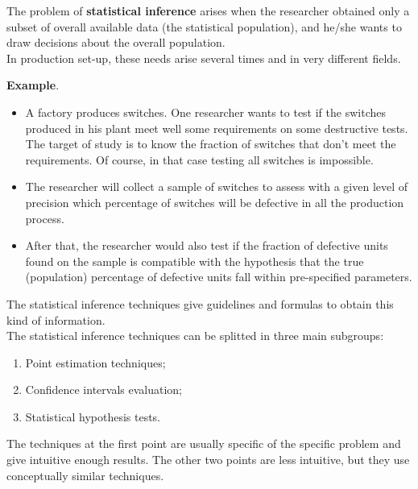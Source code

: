 
\begin{frame}
  \vspace*{.75cm}
  The problem of \textbf{statistical inference} arises when the researcher obtained only a subset of overall available data (the statistical population), and he/she wants to draw decisions about the overall population. \\
  \vspace*{.75cm}
  In production set-up, these needs arise several times and in very different fields.\\
\end{frame}    

\begin{frame}
  \textbf{Example}.\\
  \begin{itemize}
    \item A factory produces switches. One researcher wants to test if the switches produced in his plant meet well some requirements on some destructive tests. The target of study is to know the fraction of switches that don't meet the requirements. Of course, in that case testing all switches is impossible.
    \vspace*{.25cm}
    \item The researcher will collect a sample of switches to assess with a given level of precision which percentage of switches will be defective in all the production process.
    \vspace*{.25cm}
    \item After that, the researcher would also test if the fraction of defective units found on the sample is compatible with the hypothesis that the true (population) percentage of defective units fall within pre-specified parameters.
  \end{itemize}
\end{frame}

\begin{frame}
  The statistical inference techniques give guidelines and formulas to obtain this kind of information.\\
  \vspace*{.25cm}
  The statistical inference techniques can be splitted in three main subgroups:
  \begin{enumerate}
    \item Point estimation techniques;
    \vspace*{.25cm}
    \item Confidence intervals evaluation;
    \vspace*{.25cm}
    \item Statistical hypothesis tests.
  \end{enumerate}
  \vspace*{.25cm}
  The techniques at the first point are usually specific of the specific problem and give intuitive enough results. The other two points are less intuitive, but they use conceptually similar techniques. 
\end{frame}



